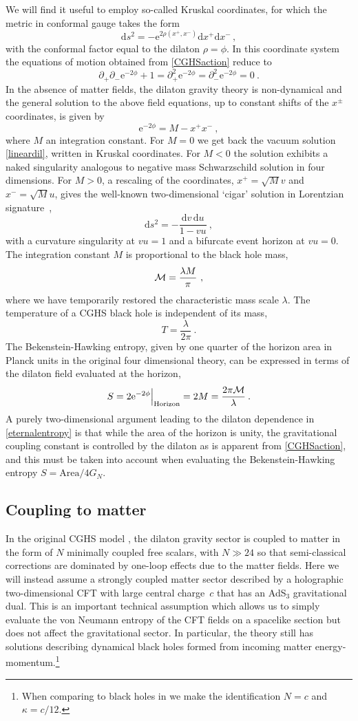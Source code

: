 \documentclass[12pt,a4paper]{article}
\newcommand{\dd}{\mathrm{d}}
\newcommand{\e}{\mathrm{e}}
\newcommand{\be}{\begin{equation}}
\newcommand{\ee}{\end{equation}}
\newcommand{\f}[2]{\frac{#1}{#2}}
\begin{document}
We will find it useful to employ so-called Kruskal coordinates, for which the metric in conformal gauge takes the form
\be\label{KruskalGauge}
\dd s^2 = - \e^{2\rho(x^+,x^-)} \dd x^+\dd x^-\,,
\ee
with the conformal factor equal to the dilaton $\rho=\phi$. In this coordinate system the equations of motion obtained from \eqref{CGHSaction} reduce to 
\be
\partial_+\partial_- \e^{-2\phi} +1= \partial_+^2  \e^{-2\phi}=\partial_-^2 \e^{-2\phi}=0~.
\ee
In the absence of matter fields, the dilaton gravity theory is non-dynamical and the general solution to the
above field equations, up to constant shifts of the $x^\pm$ coordinates, is given by
\be
\e^{-2\phi} = M- x^+x^-~,
\ee
where $M$ an integration constant. For $M=0$ we get back the vacuum solution \eqref{lineardil}, written in Kruskal coordinates. For $M<0$ the solution exhibits a naked singularity analogous to negative mass Schwarzschild solution in four dimensions. For $M>0$, a rescaling of the coordinates, $x^+ = \sqrt{M} v$ and $x^- = \sqrt{M} u$, gives the well-known two-dimensional `cigar' solution in Lorentzian signature~\cite{Mandal:1991tz,Witten:1991yr},
\be\label{WBH}
\dd s^2 = -\f{\dd v\,\dd u}{1-vu}~,
\ee
with a curvature singularity at $vu=1$ and a bifurcate event horizon at $vu=0$. The integration constant $M$ is proportional to the black hole mass,
\be
{\cal M} = \f{\lambda M}{\pi}~,
\ee
where we have temporarily restored the characteristic mass scale $\lambda$. 
The temperature of a CGHS black hole is independent of its mass,
\be\label{Htemp}
T = \f{\lambda}{2\pi}\>.
\ee
The Bekenstein-Hawking entropy, given by one quarter of the horizon area in Planck units in the original four dimensional theory, can be expressed in terms of the dilaton field evaluated at the horizon,
\be\label{eternalentropy}
S = 2\e^{-2\phi}\Big|_\text{Horizon}= 2M =  \f{2\pi\cal M}{\lambda}\>.
\ee
A purely two-dimensional argument leading to the dilaton dependence in \eqref{eternalentropy} is that while the area of the horizon is unity, the gravitational coupling constant is controlled by the dilaton as is apparent from \eqref{CGHSaction}, and this must be taken into account when evaluating the Bekenstein-Hawking entropy $S=\text{Area}/4G_N$. 


\subsection{Coupling to matter}\label{matter}
In the original CGHS model \cite{Callan:1992rs}, the dilaton gravity sector is coupled to matter in the form of $N$ minimally coupled free scalars, with $N\gg 24$ so that semi-classical corrections are dominated by one-loop effects due to the matter fields. 
Here we will instead assume a strongly coupled matter sector described by a holographic two-dimensional CFT with large central charge~$c$
that has an AdS$_3$ gravitational dual. This is an important technical assumption which allows us to simply evaluate the von Neumann entropy of the CFT fields on a spacelike section but does not affect the gravitational sector. In particular, the theory still has solutions describing dynamical black holes formed from incoming matter energy-momentum.\footnote{When comparing to black holes in \cite{Callan:1992rs,Russo:1992ax} we make the identification $N=c$ and $\kappa =  c/12$.} 
\end{document}
